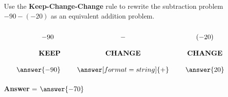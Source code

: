 \documentclass{ximera}[font=12pt]
\begin{document}
\begin{problem}
    Use the \textbf{Keep-Change-Change} rule to rewrite the subtraction problem $-90 -(-20)$ as an equivalent 
    addition problem.  

    \[
    \renewcommand{\arraystretch}{2}
    \begin{array}{r @{\hskip 24pt} c @{\hskip 24pt} c @{\hskip 24pt} c}
    -90 \quad & - & (-20) \\
    \textbf{KEEP} & \textbf{CHANGE} & \textbf{CHANGE} \\
    \answer{-90} & \answer[format=string]{+} & \answer{20}
    \end{array}
    \]

\textcolor{orange!80!black}{\textbf{Answer}} = $\answer{-70}$
                                                   
\end{problem}    
\end{document}
